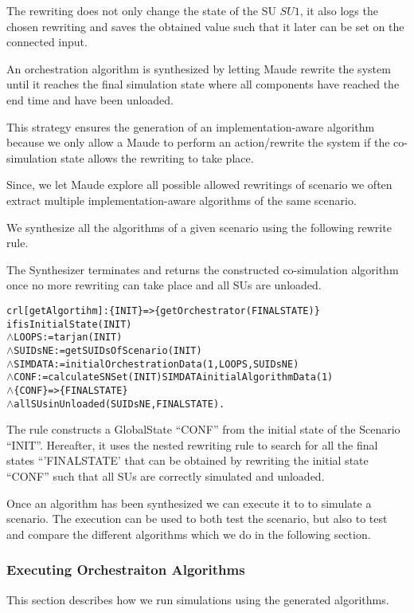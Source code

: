 The rewriting does not only change the state of the SU $SU1$, it also logs the chosen rewriting and saves the obtained value such that it later can be set on the connected input.

An orchestration algorithm is synthesized by letting Maude rewrite the system until it reaches the final simulation state where all components have reached the end time and have been unloaded.

This strategy ensures the generation of an implementation-aware algorithm because we only allow a Maude to perform an action/rewrite the system if the co-simulation state allows the rewriting to take place.

Since, we let Maude explore all possible allowed rewritings of scenario we often extract multiple implementation-aware algorithms of the same scenario.

We synthesize all the algorithms of a given scenario using the following rewrite rule.

The Synthesizer terminates and returns the constructed co-simulation algorithm once no more rewriting can take place and all SUs are unloaded.

\begin{alltt}
crl [getAlgortihm]: \{ INIT \} => \{ getOrchestrator(FINALSTATE) \}
if isInitialState(INIT)
  \(\land\) LOOPS := tarjan(INIT)
  \(\land\) SUIDsNE := getSUIDsOfScenario(INIT)
  \(\land\) SIMDATA := initialOrchestrationData(1,LOOPS,SUIDsNE)
  \(\land\) CONF := calculateSNSet(INIT) SIMDATA initialAlgorithmData(1)
  \(\land\) \{CONF\} => \{ FINALSTATE\} 
  \(\land\) allSUsinUnloaded(SUIDsNE, FINALSTATE) .
\end{alltt}


The rule constructs a GlobalState ``CONF'' from the initial state of the Scenario ``INIT''.
Hereafter, it uses the nested  rewriting rule to search for all the final states ``'FINALSTATE' that can be obtained by rewriting the initial state ``CONF'' such that all SUs are correctly simulated and unloaded.

Once an algorithm has been synthesized we can execute it to to simulate a scenario.
The execution can be used to both test the scenario, but also to test and compare the different algorithms which we do in the following section.

\subsubsection{Executing Orchestraiton Algorithms}
This section describes how we run simulations using the generated algorithms.

